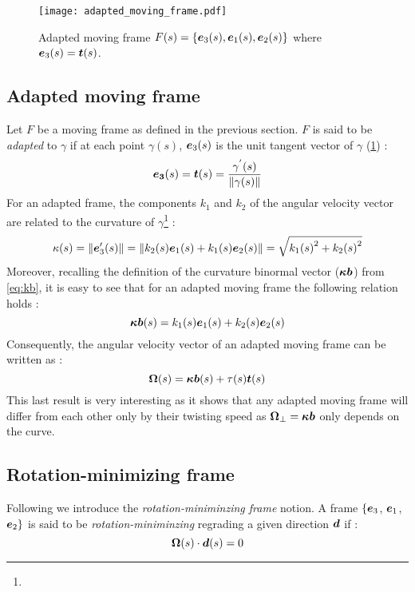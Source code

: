 \begin{figure}[t]
\centering
\texttt{[image: adapted\_moving\_frame.pdf]}
\caption{Adapted moving frame $F(s) =\{\boldsymbol{e}_{3}(s),\boldsymbol{e}_{1}(s),\boldsymbol{e}_{2}(s)\}$ where $\boldsymbol{e}_3(s) = \boldsymbol{t}(s)$.}
\label{fig:adapted}
\end{figure}

\subsection{Adapted moving frame}
Let $F$ be a moving frame as defined in the previous section. $F$ is said to be \emph{adapted} to $\gamma$ if at each point $\gamma(s)$, $\boldsymbol{e}_{3}(s)$ is the unit tangent vector of $\gamma$ (\cref{fig:adapted}) :
\begin{equation}
	\boldsymbol{e_{3}}(s) = \boldsymbol{t}(s) = \frac{\gamma^{'}(s)}{\lVert\gamma(s)\rVert}
\end{equation}
For an adapted frame, the components $k_1$ and $k_2$ of the angular velocity vector are related to the curvature of $\gamma$\footnote{} : 
\begin{equation}
	\kappa(s) = \lVert\boldsymbol{e}'_{3}(s)\rVert = \lVert k_2(s)\boldsymbol{e}_1(s) + k_1(s)\boldsymbol{e}_2(s)\rVert = \sqrt{{k_{1}(s)}^2 + {k_{2}(s)}^2}
\end{equation}
Moreover, recalling the definition of the curvature binormal vector ($\boldsymbol{\kappa b}$) from \cref{eq:kb}, it is easy to see that for an adapted moving frame the following relation holds :
 \begin{equation}
	\boldsymbol{\kappa b}(s) = k_1(s) \boldsymbol{e}_1(s) +  k_2(s) \boldsymbol{e}_2(s)
\end{equation}
Consequently, the angular velocity vector of an adapted moving frame can be written as :
 \begin{equation}
	\boldsymbol{\Omega}(s) = \boldsymbol{\kappa b}(s)  + \tau(s) \boldsymbol{t}(s)
\end{equation}
This last result is very interesting as it shows that any adapted moving frame will differ from each other only by their twisting speed as $\boldsymbol{\Omega}_{\perp} =  \boldsymbol{\kappa b}$ only depends on the curve.

\subsection{Rotation-minimizing frame}
Following \cite{Farouki2014, Wang2008} we introduce the \emph{rotation-miniminzing frame} notion. A frame $\{\boldsymbol{e}_{3}$, $\boldsymbol{e}_{1}$, $\boldsymbol{e}_{2}\}$ is said to be \emph{rotation-miniminzing} regrading a given direction $\boldsymbol{d}$ if :
\begin{equation}
	\boldsymbol{\Omega}(s) \cdot \boldsymbol{d}(s) = 0
\end{equation}

